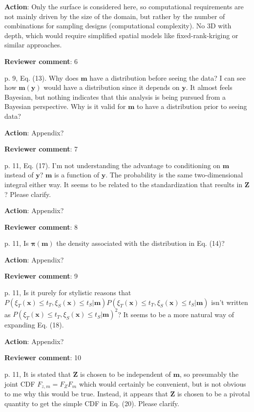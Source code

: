 \documentclass[a4paper]{article}
\newcommand{\bm}{ {\boldsymbol m} }
\newcommand{\bx}{ {\boldsymbol x} }
\newcommand{\by}{ {\boldsymbol y} }
\newcommand{\bZ}{ {\boldsymbol Z} }
\newcommand{\bpi}{ {\boldsymbol \pi} }
\def\revcom{\textbf{Reviewer comment}}
\def\action{\textbf{Action}}
\begin{document}
\begin{answers}
\action: Only the surface is considered here, so computational requirements are not mainly driven by the size of the domain, but rather by the number of combinations for sampling designs (computational complexity). No 3D with depth, which would require simplified spatial models like fixed-rank-kriging or similar approaches. 

\item{\revcom:  6}\label{r2c6}

p. 9, Eq. (13). Why does $\bm$ have a distribution before seeing the data? I can see how $\bm(\by)$ would have a distribution since it depends on $\by$. It almost feels Bayesian, but nothing indicates that this analysis is being pursued from a Bayesian perspective. Why is it valid for $\bm$ to have a distribution prior to seeing data?

\action: Appendix? 

\item{\revcom:  7}\label{r2c7}

p. 11, Eq. (17). I’m not understanding the advantage to conditioning on $\bm$ instead of $\by$? $\bm$ is a function of $\by$. The probability is the same two-dimensional integral either way. It seems to be related to the standardization that results in $\bZ$? Please clarify.

\action: Appendix? 

\item{\revcom:  8}\label{r2c8}

p. 11, Is $\bpi(\bm)$ the density associated with the distribution in Eq. (14)? 

\action: Appendix? 

\item{\revcom:  9}\label{r2c9}

p. 11, Is it purely for stylistic reasons that $P(\xi_T(\bx) \leq t_T, \xi_S(\bx) \leq t_S |\bm)P(\xi_T(\bx) \leq t_T, \xi_S(\bx) \leq t_S |\bm)$ isn’t written as $P(\xi_T(\bx) \leq t_T, \xi_S(\bx) \leq t_S |\bm)^2$? It seems to be a more natural way of expanding Eq. (18). 

\action: Appendix? 

\item{\revcom:  10}\label{r2c10}

p. 11, It is stated that $\bZ$ is chosen to be independent of $\bm$, so presumably the joint CDF $F_{z,m}=F_{Z}F_m$ which would certainly be convenient, but is not obvious to me why this would be true. 
Instead, it appears that $\bZ$ is chosen to be a pivotal quantity to get the simple CDF in Eq. (20). Please clarify.


\end{answers}
\end{document}
